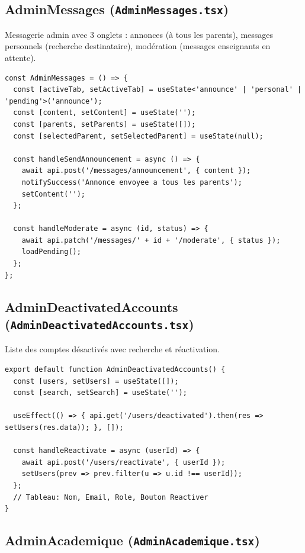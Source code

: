 \documentclass[12pt,a4paper]{article}
\begin{document}
\subsection{AdminMessages (\texttt{AdminMessages.tsx})}

Messagerie admin avec 3 onglets : annonces (à tous les parents), messages personnels (recherche destinataire), modération (messages enseignants en attente).

\begin{lstlisting}[style=code]
const AdminMessages = () => {
  const [activeTab, setActiveTab] = useState<'announce' | 'personal' | 'pending'>('announce');
  const [content, setContent] = useState('');
  const [parents, setParents] = useState([]);
  const [selectedParent, setSelectedParent] = useState(null);

  const handleSendAnnouncement = async () => {
    await api.post('/messages/announcement', { content });
    notifySuccess('Annonce envoyee a tous les parents');
    setContent('');
  };

  const handleModerate = async (id, status) => {
    await api.patch('/messages/' + id + '/moderate', { status });
    loadPending();
  };
};
\end{lstlisting}

\subsection{AdminDeactivatedAccounts (\texttt{AdminDeactivatedAccounts.tsx})}

Liste des comptes désactivés avec recherche et réactivation.

\begin{lstlisting}[style=code]
export default function AdminDeactivatedAccounts() {
  const [users, setUsers] = useState([]);
  const [search, setSearch] = useState('');

  useEffect(() => { api.get('/users/deactivated').then(res => setUsers(res.data)); }, []);

  const handleReactivate = async (userId) => {
    await api.post('/users/reactivate', { userId });
    setUsers(prev => prev.filter(u => u.id !== userId));
  };
  // Tableau: Nom, Email, Role, Bouton Reactiver
}
\end{lstlisting}

\subsection{AdminAcademique (\texttt{AdminAcademique.tsx})}
\end{document}
